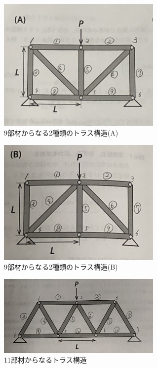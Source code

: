 \documentclass[a4paper,11pt,uplatex]{jsarticle}
\begin{document}
\begin{figure}[H]
  \begin{center}
    \includegraphics[width = 8cm]{画像/trus_a.JPG}
    \caption{9部材からなる2種類のトラス構造(A)}
    \label{trus_a}
  \end{center}
\end{figure}

\begin{figure}[H]
  \begin{center}
    \includegraphics[width = 8cm]{画像/trus_b.JPG}
    \caption{9部材からなる2種類のトラス構造(B)}
    \label{trus_b}
  \end{center}

\end{figure}
\begin{figure}[H]
  \begin{center}
    \includegraphics[width = 8cm]{画像/trus_11.JPG}
    \caption{11部材からなるトラス構造}
    \label{truss11}
  \end{center}
\end{figure}
\end{document}

